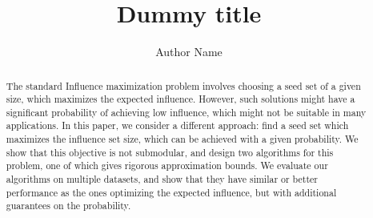\documentclass[a4paper,UKenglish,cleveref, autoref]{lipics-v2019}
\title{Dummy title} %
\author{Author Name}{Dummy University Computer Science Department,
USA \and \url{http://www.myhomepage.edu} }
{johnqpublic@dummyuni.org}{}
{}
\begin{document}
\maketitle

\begin{abstract}
The standard Influence maximization problem involves choosing a seed set of a given size,
which maximizes the expected influence. However, such solutions might have a significant
probability of achieving low influence, which might not be suitable in many applications.
In this paper, we consider a different approach: find a seed set which maximizes the influence set
size, which can be achieved with a given probability. We show that this objective is not
submodular, and design two algorithms for this problem, one of which gives rigorous approximation
bounds. We evaluate our algorithms on multiple datasets, and show that they have similar or better
performance as the ones optimizing the expected influence, but with additional guarantees on the
probability.
\end{abstract}









\end{document}
